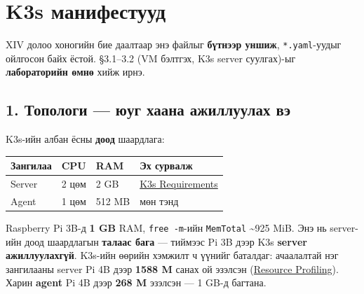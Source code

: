 \chapter{K3s манифестууд}

XIV долоо хоногийн бие даалтаар энэ файлыг \textbf{бүтнээр уншиж}, \texttt{*.yaml}-уудыг ойлгосон байх ёстой. §3.1--3.2 (VM бэлтгэх, K3s server суулгах)-ыг \textbf{лабораторийн өмнө} хийж ирнэ.

\hypertarget{ux442ux43eux43fux43eux43bux43eux433ux438-ux44eux443ux433-ux445ux430ux430ux43dux430-ux430ux436ux438ux43bux43bux443ux443ux43bux430ux445-ux432ux44d}{%
\section{1. Топологи --- юуг хаана ажиллуулах вэ}\label{ux442ux43eux43fux43eux43bux43eux433ux438-ux44eux443ux433-ux445ux430ux430ux43dux430-ux430ux436ux438ux43bux43bux443ux443ux43bux430ux445-ux432ux44d}}

K3s-ийн албан ёсны \textbf{доод} шаардлага:

\begingroup\scriptsize\begin{longtable}[]{@{}llll@{}}
\toprule
Зангилаа & CPU & RAM & Эх сурвалж\tabularnewline
\midrule
\endhead
Server & 2 цөм & 2 GB & \href{https://docs.k3s.io/installation/requirements}{K3s Requirements}\tabularnewline
Agent & 1 цөм & 512 MB & мөн тэнд\tabularnewline
\bottomrule
\end{longtable}\endgroup

Raspberry Pi 3B-д \textbf{1 GB} RAM, \texttt{free\ -m}-ийн \texttt{MemTotal} \textasciitilde925 MiB. Энэ нь server-ийн доод шаардлагын \textbf{талаас бага} --- тиймээс Pi 3B дээр K3s \textbf{server ажиллуулахгүй}. K3s-ийн өөрийн хэмжилт ч үүнийг баталдаг: ачаалалтай нэг зангилааны server Pi 4B дээр \textbf{1588 M} санах ой эзэлсэн (\href{https://docs.k3s.io/reference/resource-profiling}{Resource Profiling}). Харин \textbf{agent} Pi 4B дээр \textbf{268 M} эзэлсэн --- 1 GB-д багтана.

